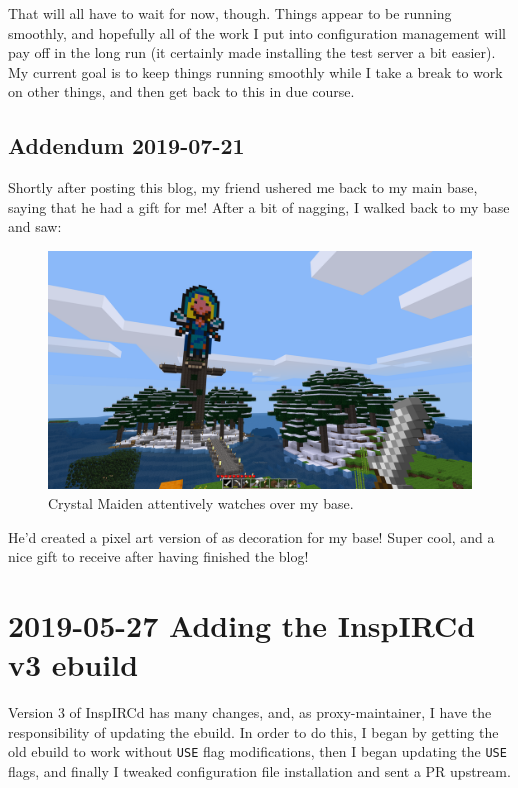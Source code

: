 \documentclass{article}
\begin{document}
That will all have to wait for now, though.  Things appear to be running smoothly, and hopefully all of the work I put into configuration management will pay off in the long run (it certainly made installing the test server a bit easier).  My current goal is to keep things running smoothly while I take a break to work on other things, and then get back to this in due course.

\subsection{Addendum 2019-07-21}
Shortly after posting this blog, my friend ushered me back to my main base, saying that he had a gift for me!  After a bit of nagging, I walked back to my base and saw:

\begin{figure}
\begin{center}
\includegraphics[scale=0.25]{files/blog/2019_07_20_minetest_5_0_1_upgrade_and_server_hosting/2019_07_20_crystal_maiden.png}
\caption{Crystal Maiden attentively watches over my base.}
\end{center}
\end{figure}

He'd created a pixel art version of   as decoration for my base!  Super cool, and a nice gift to receive after having finished the blog!


\section{2019-05-27 Adding the InspIRCd v3 ebuild}
Version 3 of InspIRCd has many changes, and, as proxy-maintainer, I have the responsibility of updating the ebuild.  In order to do this, I began by getting the old ebuild to work without \texttt{USE} flag modifications, then I began updating the \texttt{USE} flags, and finally I tweaked configuration file installation and sent a PR upstream.
\end{document}
